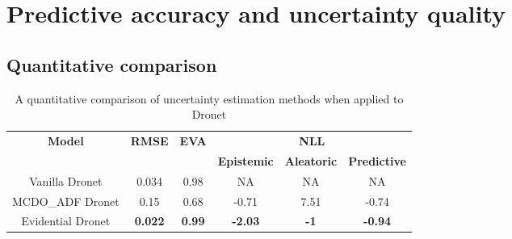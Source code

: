\section{Predictive accuracy and uncertainty quality}
\subsection{Quantitative comparison}
\begin{table}[h!]
	\centering
	\begin{tabular}{|c|c|c|c|c|c|}
		\hline
		\multirow{2}{*}{\textbf{Model}} & \multirow{2}{*}{\textbf{RMSE}} & \multirow{2}{*}{\textbf{EVA}} & \multicolumn{3}{c|}{\textbf{NLL}}                             \\ \cline{4-6} 
		&                                &                               & \textbf{Epistemic} & \textbf{Aleatoric} & \textbf{Predictive} \\ \hline
		Vanilla Dronet                  & 0.034                          & 0.98                          & NA                 & NA                 & NA                  \\ \hline
		MCDO\_ADF Dronet                & 0.15                           & 0.68                          & -0.71              & 7.51               & -0.74               \\ \hline
		Evidential Dronet               & \textbf{0.022}                 & \textbf{0.99}                 & \textbf{-2.03}     & \textbf{-1}        & \textbf{-0.94}      \\ \hline
	\end{tabular}
	\caption{A quantitative comparison of uncertainty estimation methods when applied to Dronet}
	\label{tab_quant_compare}
\end{table}
